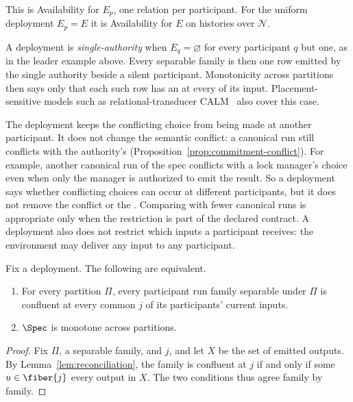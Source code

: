 This is Availability for $E_p$, one relation per participant.  For the uniform
deployment $E_p=E$ it is Availability for $E$ on histories over $\mathcal N$.

A deployment is \emph{single-authority} when $E_q=\varnothing$ for every
participant $q$ but one, as in the leader example above.  Every separable
family is then one row emitted by the single authority beside a silent
participant.  Monotonicity across partitions then says only that each such row
has an \outnoun at every \indesc of its input.  Placement-sensitive models
such as relational-transducer CALM~\cite{ameloot2013relational,ameloot2015weaker}
also cover this case.

The deployment keeps the conflicting choice from being made at another
participant.  It does not change the semantic conflict: a canonical run still
conflicts with the authority's \commitment
(Proposition~\ref{prop:commitment-conflict}).  For example, another canonical
run of the spec conflicts with a lock manager's choice even when only the
manager is authorized to emit the result.  So a deployment says whether
conflicting choices can occur at different participants, but it does not
remove the conflict or the \commitment.  Comparing \commitments with fewer
canonical runs is appropriate only when the restriction is part of the
declared contract.  A deployment also does not restrict which inputs a
participant receives: the environment may deliver any input to any
participant.

\begin{proposition}
\label{thm:complete-cap-deployment}
Fix a deployment.  The following are equivalent.
\begin{enumerate}
  \item For every partition $\Pi$, every participant run family separable
        under $\Pi$ is confluent at every common \indesc $j$ of its
        participants' current inputs.
  \item $\Spec$ is monotone across partitions.
\end{enumerate}
\end{proposition}

\begin{proof}
Fix $\Pi$, a separable family, and $j$, and let $X$ be the set of emitted
outputs.  By Lemma~\ref{lem:reconciliation}, the family is confluent at $j$ if
and only if some $u\in\fiber{j}$ \outrel every output in $X$.  The two
conditions thus agree family by family.
\end{proof}

